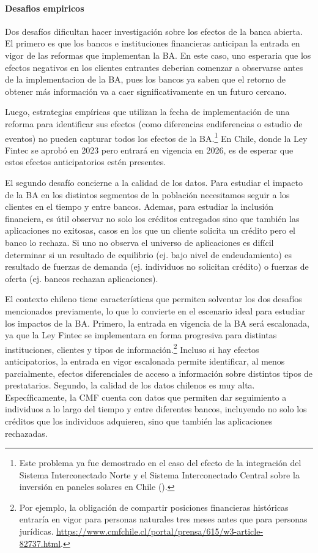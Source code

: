 \documentclass[11pt]{article}
\theoremstyle{plain}
\theoremstyle{plain}
\begin{document}
\paragraph{Desafios empiricos}

Dos desafíos dificultan hacer investigación sobre los efectos de la banca abierta. El primero es que los bancos e instituciones financieras anticipan la entrada en vigor de las reformas que implementan la BA.
En este caso, uno esperaria que los efectos negativos en los clientes entrantes deberian comenzar a observarse antes de la implementacion de la BA, pues los bancos ya saben que el retorno de obtener más información va a caer significativamente en un futuro cercano. 

Luego, estrategias empíricas que utilizan la fecha de implementación de una reforma para identificar sus efectos (como diferencias endiferencias o estudio de eventos) no pueden capturar todos los efectos de la BA.\footnote{Este problema ya fue demostrado en el caso del efecto de la integración del Sistema Interconectado Norte y el Sistema Interconectado Central sobre la inversión en paneles solares en Chile (\cite{gonzales_investment_2023}).} En Chile, donde la Ley Fintec se aprobó en 2023 pero entrará en vigencia en 2026, es de esperar que estos efectos anticipatorios estén presentes.

El segundo desafío concierne a la calidad de los datos. Para estudiar el impacto de la BA en los distintos segmentos de la población necesitamos seguir a los clientes en el tiempo y entre bancos. Ademas, para estudiar la inclusión financiera, es útil observar no solo los créditos entregados sino que también las aplicaciones no exitosas, casos en los que un cliente solicita un crédito pero el banco lo rechaza. Si uno no observa el universo de aplicaciones es difícil determinar si un resultado de equilibrio (ej. bajo nivel de endeudamiento) es resultado de fuerzas de demanda (ej. individuos no solicitan crédito) o fuerzas de oferta (ej. bancos rechazan aplicaciones).  

El contexto chileno tiene características que permiten solventar los dos desafíos mencionados previamente, lo que lo convierte en el escenario ideal para estudiar los impactos de la BA. 
Primero, la entrada en vigencia de la BA será escalonada, ya que la Ley Fintec se implementara en forma progresiva para  distintas instituciones, clientes y tipos de información.\footnote{Por ejemplo, la obligación de compartir posiciones financieras históricas entraría en vigor para personas naturales tres meses antes que para personas jurídicas. \url{https://www.cmfchile.cl/portal/prensa/615/w3-article-82737.html}.} Incluso si hay efectos anticipatorios, la entrada en vigor escalonada permite identificar, al menos parcialmente, efectos diferenciales de acceso a información sobre distintos tipos de prestatarios. Segundo, la calidad de los datos chilenos es muy alta. Específicamente, la CMF cuenta con datos que permiten dar seguimiento a individuos a lo largo del tiempo y entre diferentes bancos, incluyendo no solo los créditos que los individuos adquieren, sino que también las aplicaciones rechazadas. 
\end{document}
